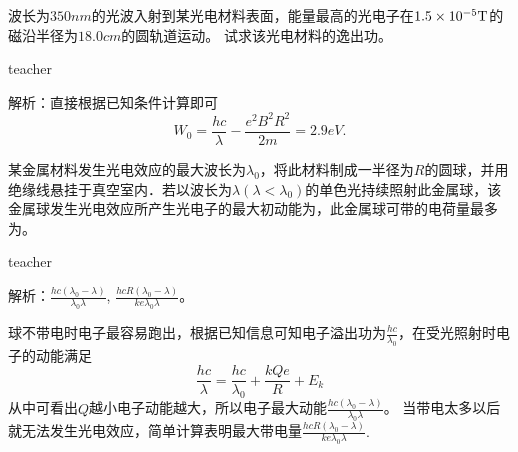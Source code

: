 \begin{example}

波长为$350\unit{nm}$的光波入射到某光电材料表面，能量最高的光电子在$1.5\times 10^{-5}{\rm{T}}$的磁沿半径为$18.0\unit{cm}$的圆轨道运动。
试求该光电材料的逸出功。
\begin{taggedblock}{teacher}

解析：直接根据已知条件计算即可
\[
W_0 = \frac{hc}{\lambda}-\frac{e^2B^2R^2}{2m} = 2.9\unit{eV}.
\]
\end{taggedblock}
\end{example}





\begin{example}

某金属材料发生光电效应的最大波长为$\lambda_0$，将此材料制成一半径为$R$的圆球，并用绝缘线悬挂于真空室内．若以波长为$\lambda(\lambda<\lambda_0)$的单色光持续照射此金属球，该金属球发生光电效应所产生光电子的最大初动能为\kong\kong ，此金属球可带的电荷量最多为\kong\kong 。
\begin{taggedblock}{teacher}

解析：$\frac{hc(\lambda_0-\lambda)}{\lambda_0\lambda}$, $\frac{hcR(\lambda_0-\lambda)}{ke\lambda_0\lambda}$。

球不带电时电子最容易跑出，根据已知信息可知电子溢出功为$\frac{hc}{\lambda_0}$，在受光照射时电子的动能满足
\[
\frac{hc}{\lambda} = \frac{hc}{\lambda_0}+\frac{kQe}{R}+E_k
\]
从中可看出$Q$越小电子动能越大，所以电子最大动能$\frac{hc(\lambda_0-\lambda)}{\lambda_0\lambda}$。
当带电太多以后就无法发生光电效应，简单计算表明最大带电量$\frac{hcR(\lambda_0-\lambda)}{ke\lambda_0\lambda}.$
\end{taggedblock}
\end{example}



